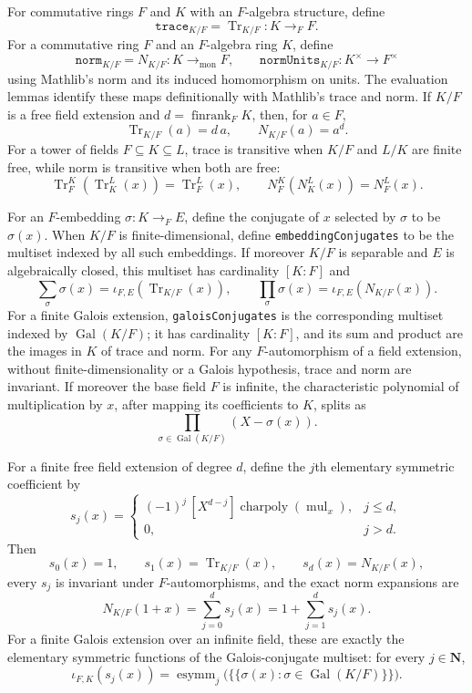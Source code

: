 \begin{definition}\label{mod:localfield-extension}
For commutative rings $F$ and $K$ with an $F$-algebra structure, define
\[
 \texttt{trace}_{K/F}=\operatorname{Tr}_{K/F}:K\to_F F.
\]
For a commutative ring $F$ and an $F$-algebra ring $K$, define
\[
 \texttt{norm}_{K/F}=N_{K/F}:K\to_{\mathrm{mon}}F,\qquad
 \texttt{normUnits}_{K/F}:K^\times\to F^\times
\]
using Mathlib's norm and its induced homomorphism on units.  The evaluation
lemmas identify these maps definitionally with Mathlib's trace and norm.  If
$K/F$ is a free field extension and $d=\operatorname{finrank}_F K$, then, for
$a\in F$,
\[
 \operatorname{Tr}_{K/F}(a)=d\,a,\qquad N_{K/F}(a)=a^d.
\]
For a tower of fields $F\subseteq K\subseteq L$, trace is transitive when
$K/F$ and $L/K$ are finite free, while norm is transitive when both are free:
\[
 \operatorname{Tr}_{F}^{K}\!\left(\operatorname{Tr}_{K}^{L}(x)\right)
   =\operatorname{Tr}_{F}^{L}(x),\qquad
 N_{F}^{K}\!\left(N_{K}^{L}(x)\right)=N_{F}^{L}(x).
\]

For an $F$-embedding $\sigma:K\to_F E$, define the conjugate of $x$ selected
by $\sigma$ to be $\sigma(x)$.  When $K/F$ is finite-dimensional, define
\texttt{embeddingConjugates} to be the multiset indexed by all such
embeddings.  If moreover $K/F$ is separable and $E$ is algebraically closed,
this multiset has cardinality $[K:F]$ and
\[
 \sum_\sigma\sigma(x)=\iota_{F,E}\!\left(\operatorname{Tr}_{K/F}(x)\right),
 \qquad
 \prod_\sigma\sigma(x)=\iota_{F,E}\!\left(N_{K/F}(x)\right).
\]
For a finite Galois extension, \texttt{galoisConjugates} is the corresponding
multiset indexed by $\operatorname{Gal}(K/F)$; it has cardinality $[K:F]$,
and its sum and product are the images in $K$ of trace and norm.  For any
$F$-automorphism of a field extension, without finite-dimensionality or a
Galois hypothesis, trace and norm are invariant.  If moreover the base field
$F$ is infinite, the characteristic polynomial of
multiplication by $x$, after mapping its coefficients to $K$, splits as
\[
 \prod_{\sigma\in\operatorname{Gal}(K/F)}(X-\sigma(x)).
\]

For a finite free field extension of degree $d$, define the $j$th elementary
symmetric coefficient by
\[
 s_j(x)=
 \begin{cases}
 (-1)^j\,[X^{d-j}]
   \operatorname{charpoly}(\operatorname{mul}_x),&j\le d,\\
 0,&j>d.
 \end{cases}
\]
Then
\[
 s_0(x)=1,\qquad s_1(x)=\operatorname{Tr}_{K/F}(x),\qquad
 s_d(x)=N_{K/F}(x),
\]
every $s_j$ is invariant under $F$-automorphisms, and the exact norm
expansions are
\[
 N_{K/F}(1+x)=\sum_{j=0}^{d}s_j(x)
 =1+\sum_{j=1}^{d}s_j(x).
\]
For a finite Galois extension over an infinite field, these are exactly the
elementary symmetric functions of the Galois-conjugate multiset: for every
$j\in\mathbf N$,
\[
 \iota_{F,K}(s_j(x))=
 \operatorname{esymm}_j\bigl(\{\!\{\sigma(x):
   \sigma\in\operatorname{Gal}(K/F)\}\!\}\bigr).
\]


\end{definition}
